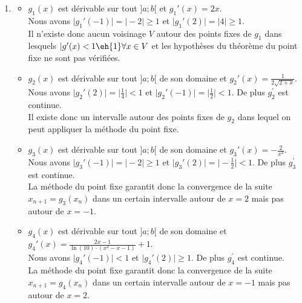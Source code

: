 \begin{enumerate}[label=R4.\arabic*, font=\bfseries, itemsep=8mm,labelsep*=4mm]
\begin{enumerate}[label=\roman*),itemsep=3mm]
\item\begin{itemize}[itemsep=2mm,left=0mm,labelsep*=2mm]
\item $g_1(x)$ est dérivable sur tout $]a;b[$ et $g_1'(x)=2x$.\\ Nous avons $\vert g_1'(-1)\vert=\vert-2\vert \geqslant 1$ et $\vert g_1'(2)\vert=\vert 4\vert \geqslant1$.\\
Il n'existe donc aucun voisinage $V$ autour des points fixes de $g_1$ dans lesquels $\vert g^\prime(x)<1 \eh{1}\forall x\in V$ et les hypothèses du théorème du point fixe ne sont pas vérifiées. %

\item
$g_2(x)$ est dérivable sur tout $]a;b[$ de son domaine et $\textstyle g_2'(x)=\frac{1}{2\sqrt{2+x}}$.\\ 
Nous avons $\textstyle \vert g_2'(2)\vert=\vert \frac{1}{4}\vert <1$ et $\textstyle \vert g_2'(-1)\vert=\vert \frac{1}{2}\vert <1$. De plus $g_2^\prime$ est continue.\\
Il existe donc un intervalle autour des points fixes de $g_2$ dans lequel on peut appliquer la méthode du point fixe. 

\item
$g_3(x)$ est dérivable sur tout $]a;b[$ de son domaine et $g_3'(x)=-\frac{2}{x^2}$.\\ 
Nous avons $\vert g_3'(-1)\vert=\vert-2\vert \geqslant 1$ et $\textstyle \vert g_3'(2)\vert=\vert -\frac{1}{2}\vert <1$. De plus $g_3^\prime$ est continue.\\
La méthode du point fixe garantit donc la convergence de la suite $x_{n+1}=g_3(x_n)$ dans un certain intervalle autour de $x=2$ mais pas autour de $x=-1$. 

\item
$g_4(x)$ est dérivable sur tout $]a;b[$ de son domaine et $\textstyle g_4'(x)=\frac{2x-1}{\ln(10)\cdot(x^2-x-1)}+1$.\\ 
Nous avons $\vert g_4'(-1)\vert< 1$ et $\textstyle \vert g_4'(2)\vert \geqslant 1$. De plus $g_4^\prime$ est continue.\\
La méthode du point fixe garantit donc la convergence de la suite $x_{n+1}=g_4(x_n)$ dans un certain intervalle autour de $x=-1$ mais pas autour de $x=2$.\\


\end{itemize}
\end{enumerate}
\end{enumerate}
